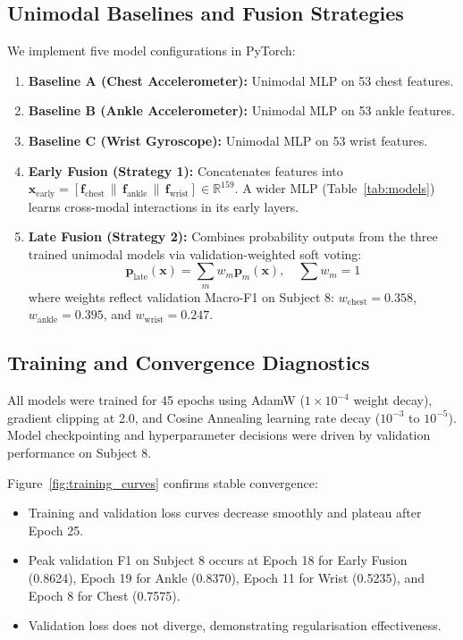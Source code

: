 \documentclass[10pt,twocolumn]{article}
\begin{document}
\subsection{Unimodal Baselines and Fusion Strategies}
We implement five model configurations in PyTorch:
\begin{enumerate}
    \item \textbf{Baseline A (Chest Accelerometer):} Unimodal MLP on 53 chest features.
    \item \textbf{Baseline B (Ankle Accelerometer):} Unimodal MLP on 53 ankle features.
    \item \textbf{Baseline C (Wrist Gyroscope):} Unimodal MLP on 53 wrist features.
    \item \textbf{Early Fusion (Strategy 1):} Concatenates features into $\mathbf{x}_{\text{early}} = [\mathbf{f}_{\text{chest}} \,\|\, \mathbf{f}_{\text{ankle}} \,\|\, \mathbf{f}_{\text{wrist}}] \in \mathbb{R}^{159}$. A wider MLP (Table~\ref{tab:models}) learns cross-modal interactions in its early layers.
    \item \textbf{Late Fusion (Strategy 2):} Combines probability outputs from the three trained unimodal models via validation-weighted soft voting:
    \begin{equation}
        \mathbf{p}_{\text{late}}(\mathbf{x}) = \sum_{m} w_m \mathbf{p}_m(\mathbf{x}), \quad \sum w_m = 1
    \end{equation}
    where weights reflect validation Macro-F1 on Subject 8: $w_{\text{chest}} = 0.358$, $w_{\text{ankle}} = 0.395$, and $w_{\text{wrist}} = 0.247$.
\end{enumerate}

\subsection{Training and Convergence Diagnostics}
All models were trained for 45 epochs using AdamW ($1 \times 10^{-4}$ weight decay), gradient clipping at 2.0, and Cosine Annealing learning rate decay ($10^{-3}$ to $10^{-5}$). Model checkpointing and hyperparameter decisions were driven by validation performance on Subject 8.

Figure~\ref{fig:training_curves} confirms stable convergence:
\begin{itemize}
    \item Training and validation loss curves decrease smoothly and plateau after Epoch 25.
    \item Peak validation F1 on Subject 8 occurs at Epoch 18 for Early Fusion (0.8624), Epoch 19 for Ankle (0.8370), Epoch 11 for Wrist (0.5235), and Epoch 8 for Chest (0.7575).
    \item Validation loss does not diverge, demonstrating regularisation effectiveness.
\end{itemize}
\end{document}

